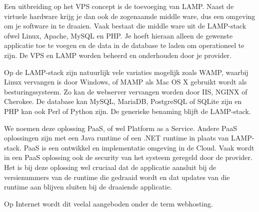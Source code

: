 Een uitbreiding op het VPS concept is de toevoeging van LAMP. Naast de virtuele hardware krijg je dan ook de zogenaamde middle ware, dus een omgeving om je software in te draaien. Vaak bestaat die middle ware uit de LAMP-stack ofwel Linux, Apache, MySQL en PHP. Je hoeft hieraan alleen de gewenste applicatie toe te voegen en de data in de database te laden om operationeel te zijn. De VPS en LAMP worden beheerd en onderhouden door je provider.

Op de LAMP-stack zijn natuurlijk vele variaties mogelijk zoals WAMP, waarbij Linux vervangen is door Windows, of MAMP als Mac OS X gebruikt wordt als besturingssysteem. Zo kan de webserver vervangen worden door IIS, NGINX of Cherokee. De database kan MySQL, MariaDB, PostgreSQL of SQLite zijn en PHP kan ook Perl of Python zijn. De generieke benaming blijft de LAMP-stack.

We noemen deze oplossing PaaS, of wel Platform as a Service. Andere PaaS oplossingen zijn met een Java runtime of een .NET runtime in plaats van LAMP-stack. PaaS is een ontwikkel en implementatie omgeving in de Cloud. Vaak wordt in een PaaS oplossing ook de security van het systeem geregeld door de provider. Het is bij deze oplossing wel cruciaal dat de applicatie aansluit bij de versienummers van de runtime die gedraaid wordt en dat updates van die runtime aan blijven sluiten bij de draaiende applicatie.

Op Internet wordt dit veelal aangeboden onder de term webhosting.
